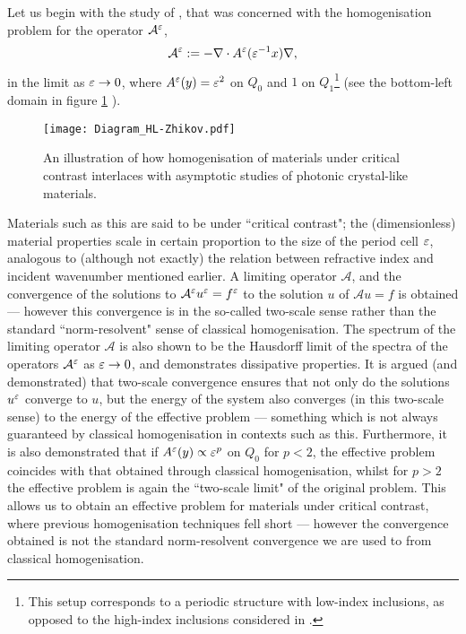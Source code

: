 Let us begin with the study of \cite{zhikov2000extension}, that was concerned with the homogenisation problem for the operator $\mathcal{A}^{\varepsilon}$,
\begin{align*}
	\mathcal{A}^{\varepsilon} := -\nabla\cdot A^{\varepsilon}(\varepsilon^{-1}x)\nabla,
\end{align*}
in the limit as $\varepsilon\rightarrow0$, where $A^{\varepsilon}(y)=\varepsilon^2$ on $Q_0$ and $1$ on $Q_1$\footnote{This setup corresponds to a periodic structure with low-index inclusions, as opposed to the high-index inclusions considered in .} (see the bottom-left domain in figure \ref{fig:Diagram_HL-Zhikov} ).
\begin{figure}[h]
	\centering
	\texttt{[image: Diagram\_HL-Zhikov.pdf]}
	\caption{\label{fig:Diagram_HL-Zhikov} An illustration of how homogenisation of materials under critical contrast interlaces with asymptotic studies of photonic crystal-like materials.}
\end{figure}
Materials such as this are said to be under ``critical contrast"; the (dimensionless) material properties scale in certain proportion to the size of the period cell $\varepsilon$, analogous to (although not exactly) the relation between refractive index and incident wavenumber mentioned earlier.
A limiting operator $\mathcal{A}$, and the convergence of the solutions to $\mathcal{A}^{\varepsilon}u^{\varepsilon}=f^{\varepsilon}$ to the solution $u$ of $\mathcal{A}u=f$ is obtained --- however this convergence is in the so-called two-scale sense rather than the standard ``norm-resolvent" sense of classical homogenisation.
The spectrum of the limiting operator $\mathcal{A}$ is also shown to be the Hausdorff limit of the spectra of the operators $\mathcal{A}^{\varepsilon}$ as $\varepsilon\rightarrow0$, and demonstrates dissipative properties.
It is argued (and demonstrated) that two-scale convergence ensures that not only do the solutions $u^{\varepsilon}$ converge to $u$, but the energy of the system also converges (in this two-scale sense) to the energy of the effective problem --- something which is not always guaranteed by classical homogenisation in contexts such as this. 
Furthermore, it is also demonstrated that if $A^{\varepsilon}(y)\propto\varepsilon^p$ on $Q_0$ for $p<2$, the effective problem coincides with that obtained through classical homogenisation, whilst for $p>2$ the effective problem is again the ``two-scale limit" of the original problem.
This allows us to obtain an effective problem for materials under critical contrast, where previous homogenisation techniques fell short --- however the convergence obtained is not the standard norm-resolvent convergence we are used to from classical homogenisation.

